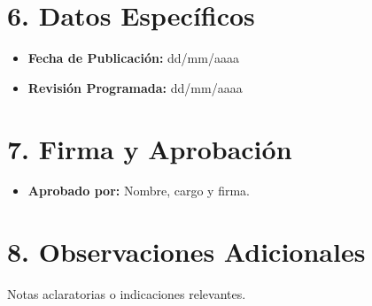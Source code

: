 \documentclass[12pt,a4paper]{article}
\begin{document}
\section*{6. Datos Específicos}
\begin{itemize}
    \item \textbf{Fecha de Publicación:} dd/mm/aaaa
    \item \textbf{Revisión Programada:} dd/mm/aaaa
\end{itemize}

\section*{7. Firma y Aprobación}
\begin{itemize}
    \item \textbf{Aprobado por:} Nombre, cargo y firma.
\end{itemize}

\section*{8. Observaciones Adicionales}
Notas aclaratorias o indicaciones relevantes.
\end{document}
